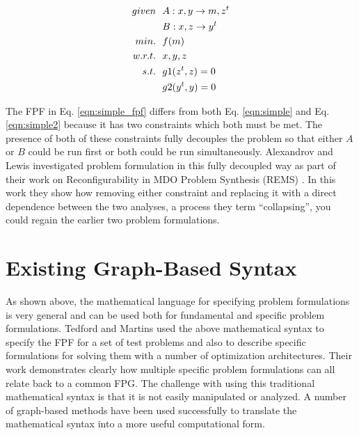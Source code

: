     \begin{align}
        given & \ \ A: {x,y} \rightarrow {m,z^t} \notag
        \\      & \ \ B: {x,z} \rightarrow {y^t} \notag
        \\min. &\ \ f(m) \notag
        \\w.r.t. & \ \ x,y,z \notag
        \\s.t. & \ \ g1(z^t,z) = 0 \notag
        \\     & \ \ g2(y^t,y) = 0
        \label{eqn:simple_fpf}
    \end{align}

    The FPF in Eq. \ref{eqn:simple_fpf} differs from both Eq. \ref{eqn:simple} and Eq. \ref{eqn:simple2} because it has 
    two constraints which both must be met. The presence of both of these constraints fully decouples the problem so that 
    either $A$ or $B$ could be run first or both could be run simultaneously. Alexandrov and Lewis investigated problem 
    formulation in this fully decoupled way as part of their work on 
    Reconfigurability in MDO Problem Synthesis (REMS) \cite{alexandrov2004}.
    In this work they show how removing either constraint and replacing 
    it with a direct dependence between the two analyses, a process they term ``collapsing'', 
    you could regain the earlier two problem formulations. 


\section{Existing Graph-Based Syntax}
	\label{s:existing syntax}
    As shown above, the mathematical language for specifying problem formulations is very general and can be used both for 
	fundamental and specific problem formulations. Tedford and Martins used the above mathematical syntax to specify the 
	FPF for a set of test problems and also to describe specific formulations for solving them with a 
    number of optimization architectures\cite{Tedford2009}. Their work demonstrates clearly how multiple specific 
    problem formulations can all relate back to a common FPG. The challenge with using this 
    traditional mathematical syntax is that it is not easily manipulated or analyzed. 
    A number of graph-based methods have been used successfully to translate the 
    mathematical syntax into a more useful computational form. 
    
